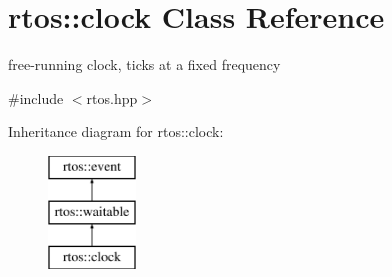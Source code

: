 \hypertarget{classrtos_1_1clock}{}\section{rtos\+:\+:clock Class Reference}
\label{classrtos_1_1clock}


free-\/running clock, ticks at a fixed frequency  




{\ttfamily \#include $<$rtos.\+hpp$>$}

Inheritance diagram for rtos\+:\+:clock\+:\begin{figure}[H]
\begin{center}
\leavevmode
\includegraphics[height=3.000000cm]{classrtos_1_1clock}
\end{center}
\end{figure}
